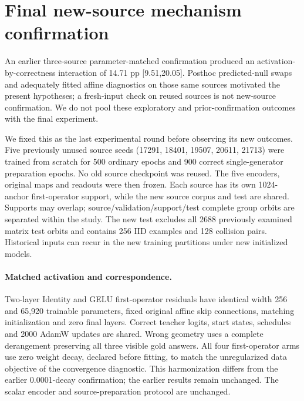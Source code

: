 \section{Final new-source mechanism confirmation}
An earlier three-source parameter-matched confirmation produced an activation-by-correctness interaction of 14.71 pp [9.51,20.05]. Posthoc predicted-null swaps and adequately fitted affine diagnostics on those same sources motivated the present hypotheses; a fresh-input check on reused sources is not new-source confirmation. We do not pool these exploratory and prior-confirmation outcomes with the final experiment.

We fixed this as the last experimental round before observing its new outcomes. Five previously unused source seeds (17291, 18401, 19507, 20611, 21713) were trained from scratch for 500 ordinary epochs and 900 correct single-generator preparation epochs. No old source checkpoint was reused. The five encoders, original maps and readouts were then frozen. Each source has its own 1024-anchor first-operator support, while the new source corpus and test are shared. Supports may overlap; source/validation/support/test complete group orbits are separated within the study. The new test excludes all 2688 previously examined matrix test orbits and contains 256 IID examples and 128 collision pairs. Historical inputs can recur in the new training partitions under new initialized models.

\paragraph{Matched activation and correspondence.}
Two-layer Identity and GELU first-operator residuals have identical width 256 and 65,920 trainable parameters, fixed original affine skip connections, matching initialization and zero final layers. Correct teacher logits, start states, schedules and 2000 AdamW updates are shared. Wrong geometry uses a complete derangement preserving all three visible gold answers. All four first-operator arms use zero weight decay, declared before fitting, to match the unregularized data objective of the convergence diagnostic. This harmonization differs from the earlier 0.0001-decay confirmation; the earlier results remain unchanged. The scalar encoder and source-preparation protocol are unchanged.

